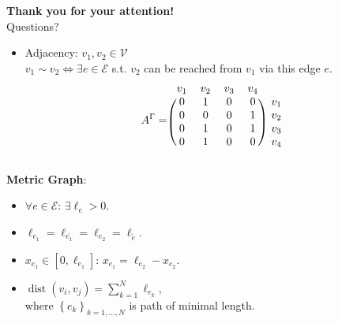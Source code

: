 \documentclass[9pt]{beamer}
\begin{document}
\begin{frame}
    \begin{center}
        \textbf{Thank you for your attention!} \\
        Questions?
    \end{center}
\end{frame}


\begin{frame}
    \begin{itemize}
        \item Adjacency: $v_1, v_2 \in \mathcal{V}$ \\ $v_1 \sim v_2 \Leftrightarrow \exists e \in \mathcal{E}$ s.t. $v_2$ can be reached from $v_1$ via this edge $e$. \\
        \begin{equation*}
          A^{\Gamma} = 
          \begin{blockarray}{ccccc}
              v_1 & v_2 & v_3 & v_4 \\
              \begin{block}{(cccc)c}
                  0 & 1 & 0 & 0 & v_1 \\
                  0 & 0 & 0 & 1 & v_2 \\
                  0 & 1 & 0 & 1 & v_3 \\
                  0 & 1 & 0 & 0 & v_4 \\
              \end{block}
          \end{blockarray}
      \end{equation*}
    \end{itemize}
    \textbf{Metric Graph}:
        \begin{itemize}
            \item $\forall e \in \mathcal{E} \colon \, \exists \ell_e > 0$.
            \item $\ell_{e_1} = \ell_{\overline{e_1}} = \ell_{e_2} = \ell_{\tilde{e}}$.
            \item $x_{e_1} \in [0, \ell_{e_1}] \colon \, x_{e_1} = \ell_{e_2} - x_{e_2}$.
            \item $\operatorname{dist}(v_i, v_j) = \sum^{N}_{k = 1} \ell_{e_k}$, \\ where $\left\{ e_k \right\}_{k = 1, \ldots, N}$ is path of minimal length.
        \end{itemize}
\end{frame}
\end{document}
